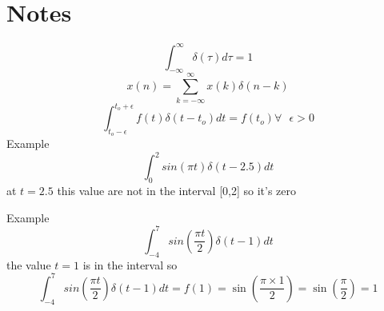\documentclass[11pt,a4paper]{article}
\theoremstyle{definition}
\begin{document}
\section{Notes}
\[
    \int_{-\infty}^{\infty} \delta(\tau)d\tau = 1
\]
\[
    x(n) = \sum_{k=-\infty}^{\infty} x(k) \delta(n-k)
\]
\[
    \displaystyle \int_{t_o - \epsilon}^{t_o + \epsilon}  
    f(t)\delta(t-t_o)dt = f(t_o) \forall \ \ \ \epsilon > 0
\]
Example
\[
    \int_0^2 sin(\pi t) \delta(t-2.5) dt  
\]
at $ t = 2.5 $ this  value are not in the interval [0,2] so it's zero



Example
\[
    \int_{-4}^7 sin(\frac{\pi t}{2}) \delta(t-1) dt  
\]
the value $ t = 1 $ is in the interval so 
\[
    \int_{-4}^7 sin(\frac{\pi t}{2}) \delta(t-1) dt =
    f(1) = \sin(\frac{\pi \times 1}{2}) = \sin(\frac{\pi}{2}) = 1
\]
\end{document}
